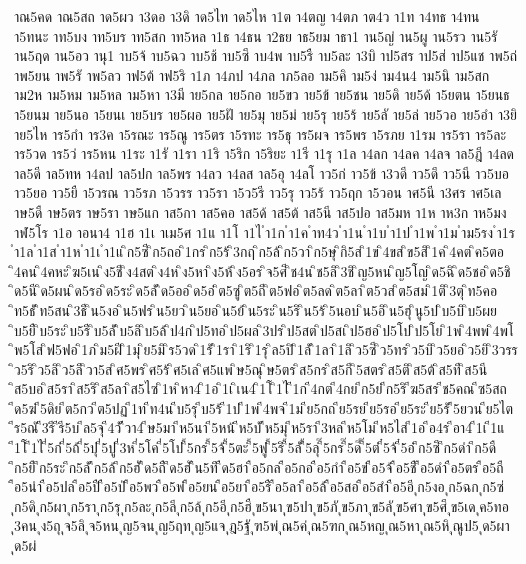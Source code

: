 {าณ5คด
าณ5สถ
าด5ผว
า3ดอ
า3ดิ
าด5ไท
าด5ไห
า1ต
า4ตญ
า4ตภ
าต4ว
า1ท
า4ทธ
า4ทน
า5ทนะ
าท5บง
าท5บร
าท5สก
าท5หล
า1ธ
า4ธน
า2ธย
าธ5ยม
าธา1
าน5ญ่
าน5ผู
าน5รว
าน5รั
าน5ฤด
าน5อว
านุ1
าบ5จ้
าบ5ฉว
าบ5ช้
าบ5ซึ
าบ4พ
าบ5รื
าบ5ละ
า3บิ
าป5สร
าป5ส่
าป5แช
าพ5ถ่
าพ5ยน
าพ5รั
าพ5ลว
าฟ5ต้
าฟ5ริ
า1ภ
า4ภป
า4ภล
าภ5ลอ
าม5คิ
าม5ง่
าม4น4
าม5นิ
าม5สก
าม2ห
าม5หม
าม5หล
าม5หา
า3มี
าย5กล
าย5กอ
าย5ขว
าย5ข้
าย5ชน
าย5ดิ
าย5ด้
า5ยตน
า5ยนธ
า5ยนม
าย5นอ
า5ยนเ
าย5บร
าย5ผอ
าย5ฝั
าย5มุ
าย5ม่
าย5รุ
าย5ร้
าย5ลั
าย5ล่
าย5วอ
าย5อำ
า3ยิ
าย5ไห
าร5กำ
าร3ค
า5รณะ
าร5ณู
าร5ตร
า5รทะ
าร5ธุ
าร5ผจ
าร5พร
า5รภย
า1รม
าร5รา
าร5ละ
าร5วด
าร5ว่
าร5หน
า1ระ
า1รั
า1รา
า1ริ
า5ริก
า5ริยะ
า1รี
า1รุ
า1ล
า4ลก
า4ลค
า4ลจ
าล5ฎี
า4ลด
าล5ดี
าล5ทห
า4ลป
าล5ปก
าล5พร
า4ลว
า4ลส
าล5อุ
า4ลโ
าว5ก่
าว5ข้
า3วดี
าว5ดึ
าว5นี
าว5บอ
าว5ยอ
าว5ยื
า5วรณ
าว5รภ
า5วรร
าว5รา
า5ว5รี
าว5รุ
าว5ร้
าว5ฤก
า5วอน
าศ5นี
า3ศร
าศ5เล
าษ5ดื
าษ5ตร
าษ5รา
าษ5แก
าส5กา
าส5คอ
าส5ด้
าส5ต้
าส5นี
าส5ปอ
าส5มห
า1ห
าห3ก
าห5มง
าฬ5โร
า1อ
าอนา4
า1ฮ
า1เ
าเม5ศ
า1แ
า1โ
า1ไ
ำ1ก
ำ1ค
ำท4ว
ำ1น
ำ1บ
ำ1ป
ำ1พ
ำ1ม
ำม5รง
ำ1ร
ำ1ล
ำ1ส
ำ1ห
ำ1เ
ำ1แ
ิก5ซี
ิก5ถอ
ิ1กร
ิก5ร้
ิ3กฤ
ิก5ล้
ิก5วา
ิก5ษุ
ิกิ5ส
ิ1ข
ิ4ขส
ิข5สิ
ิ1ค
ิ4คต
ิค5ตอ
ิ4คน
ิ4คหะ
ิฆ5เน
ิง5ชี
ิง4สต
ิง4ห
ิง5หา
ิง5ห้
ิง5อร
ิจ5ศี
ิช4น
ิช5ลิ
ิ3ชิ
ิญ5หน
ิญ5โญ
ิด5ฉิ
ิด5ชอ
ิด5ชิ
ิด5นี
ิด5ผน
ิด5รอ
ิด5ระ
ิด5ลั
ิด5ออ
ิด5อ่
ิต5ซู
ิต5ถี
ิต5ฟอ
ิต5ลด
ิต5ลา
ิต5วส
ิต5สม
ิ1ติ
ิ3ตุ
ิท5คอ
ิท5ธั
ิท5สน
ิ3ธี
ิน5งอ
ิน5ฟร
ิน5ยว
ิน5ยอ
ิน5ย้
ิน5ระ
ิน5ริ
ิน5ร้
ิ5นอบ
ิน5อิ
ิน5ฮุ
ินู5ป
ิบ5บิ
ิบ5ผย
ิบ5ยื
ิบ5ระ
ิบ5รี
ิบ5ลั
ิบ5ลิ
ิบ5ล้
ิป4ก
ิป5ทอ
ิป5ผล
ิ3ปร
ิป5สต
ิป5สเ
ิป5ฮอ
ิป5โป
ิป5โย
ิ1พ
ิ4พพ
ิ4พโ
ิพ5โส
ิฟ5ฟอ
ิ1ภ
ิม5ฝี
ิ1มุ
ิย5มิ
ิร5วด
ิ1รั
ิ1รา
ิ1ริ
ิ1รุ
ิล5ปิ
ิ1ลั
ิ1ลา
ิ1ลิ
ิว5ซี
ิว5ทร
ิว5บิ
ิว5ยอ
ิว5ยิ
ิ3วรร
ิว5ริ
ิว5ลิ
ิว5ลึ
ิวา5ส
ิศ5พร
ิศ5ร้
ิศ5เล
ิศ5แพ
ิษ5ณุ
ิษ5ตร
ิส5กร
ิส5กี
ิ5สตร
ิส5ติ
ิส5ต้
ิส5ที
ิส5นี
ิส5บอ
ิส5รา
ิส5ริ
ิส5ลา
ิส5ไซ
ิ1ห
ิหา4
ิ1อ
ิ1เ
ิเน4
ิ1โ
ิ1ไ
ี1ก
ี4กต
ี4กย
ีก5ย่
ีก5ริ
ีฆ5สร
ีช5คณ
ีซ5สถ
ีด5ฆ่
ี5ดิย
ีต5กว
ีต5ปฏ
ี1ท
ีท4น
ีบ5รุ
ีบ5ร้
ี1ป
ี1พ
ี4พจ
ี1ม
ีย5กถ
ีย5รย
ีย5รอ
ีย5ระ
ีย5รั
ี5ยวน
ีย5ไต
ีร5ณั
ี3รี
ีรี5บ
ีล5จุ
ี4วั
ีวา4
ีษ5มา
ีห5นา
ี5หน้
ีห5บั
ีห5มุ
ีห5รา
ี3หล
ีห5โม
ีห5ไส
ี1อ
ีอ4ร
ีอา4
ี1เ
ี1แ
ี1โ
ี1ไ
ี่5ก่
ี่5ถ้
ี่5ปุ
ี่5ปู
ี่3ห
ี่5โค
ี่5โป
ี้5กร
ี้5จ้
ี้5ตะ
ี้5ฟู
ี้5ริ
ี้5ลั
ี้5ลุ
ี๊5กร
ี๊5ด๊
ี๊5ต่
ี๋5จ้
ี๋5อ๋
ึก5ซึ
ึก5ดำ
ึก5ดื
ึก5ยื
ึก5ระ
ึก5ลั
ึก5ล้
ึก5ฮั
ึด5ถื
ึด5ฮั
ึน5ทึ
ืด5ฮา
ือ5กล
ือ5กอ
ือ5กำ
ือ5ข่
ือ5จ้
ือ5ชื
ือ5ดำ
ือ5ตร
ือ5ถื
ือ5นำ
ือ5ปล
ือ5ปื
ือ5ป่
ือ5พว
ือ5พ่
ือ5ยน
ือ5ยา
ือ5รื
ือ5ลา
ือ5ล้
ือ5สอ
ือ5สำ
ือ5อี
ุก5งอ
ุก5ฉก
ุก5ซ่
ุก5ดิ
ุก5ผา
ุก5รา
ุก5รุ
ุก5ละ
ุก5ลี
ุก5ล้
ุก5อี
ุก5ฮื
ุข5นา
ุข5ปา
ุข5ภั
ุข5ภา
ุข5ลั
ุข5ศา
ุข5ศึ
ุข5เด
ุค5ทอ
ุ3คน
ุง5ถุ
ุจ5ลิ
ุจ5หน
ุญ5จน
ุญ5ฤท
ุญ5แจ
ุฎ5ฐั
ุฑ5พ่
ุณ5ค่
ุณ5ฑก
ุณ5หญ
ุณ5หา
ุณ5หิ
ุณูป5
ุด5ผา
ุด5ผ่
}
